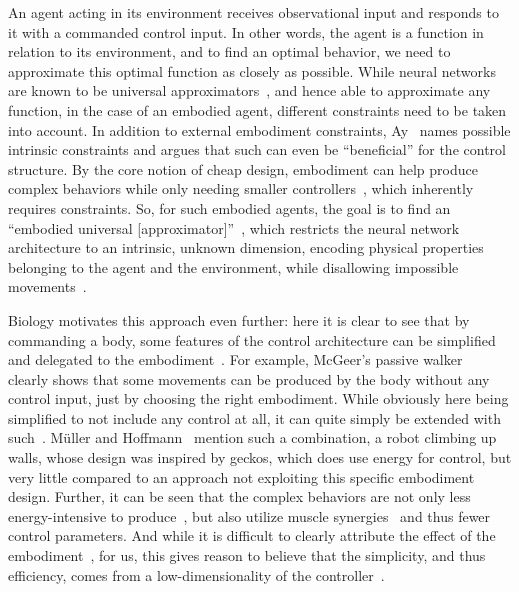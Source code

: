 An agent acting in its environment receives observational input and responds to it with a commanded
control input.
In other words, the agent is a function in relation to its environment, and to find an optimal
behavior, we need to approximate this optimal function as closely as possible. While neural networks
are known to be universal approximators~\cite{Cybenko1989Approximation,Hornik1989Multilayer}, and
hence able to approximate any function, in the case of an embodied agent, different constraints need to
be taken into account. In addition to external embodiment constraints, Ay~\cite[p.~392]{Ay2015Geometric} names
possible intrinsic constraints and argues that such can even be ``beneficial'' for the control
structure. By the core notion of cheap design, embodiment can help produce complex
behaviors while only needing smaller controllers~\cite{Pfeifer2006HowBody}, which
inherently requires constraints. So, for such embodied agents, the goal is to find an ``embodied universal
[approximator]''~\cite[p.~3]{Montufar2015CheapControl}, which restricts the neural network
architecture to an intrinsic, unknown dimension, encoding physical properties belonging to the agent
and the environment, while disallowing impossible movements~\cite[Sec.~3]{Montufar2015CheapControl}.

Biology motivates this approach even further: here it is clear to see that by commanding a body,
some features of the control architecture can be simplified and delegated to the
embodiment~\cite{Mueller2017Morphological}. For example, McGeer's passive walker~\cite{McGeer1990Passive} clearly
shows that some movements can be produced by the body without any control input, just by choosing
the right embodiment. While obviously here being simplified to not include any control at all, it
can quite simply be extended with such~\cite[Sec.~10]{McGeer1988Stability}.
M{\"u}ller and Hoffmann~\cite[p.~4]{Mueller2017Morphological} mention such a combination, a robot
climbing up walls, whose design was inspired by geckos, which does use energy for control, but
very little compared to an approach not exploiting this specific embodiment design. Further, it can
be seen that the complex
behaviors are not only less energy-intensive to produce~\cite[p.~4]{Mueller2017Morphological}, but also utilize muscle
synergies~\cite{DAvella2003Combinations} and thus fewer control parameters. And while it is
difficult to clearly attribute the effect of the embodiment~\cite{Zahedi2013Quantifying}, for us,
this gives reason to believe that the simplicity, and thus efficiency, comes from a
low-dimensionality of the controller~\cite[Sec.~5]{Montufar2015CheapControl}.

